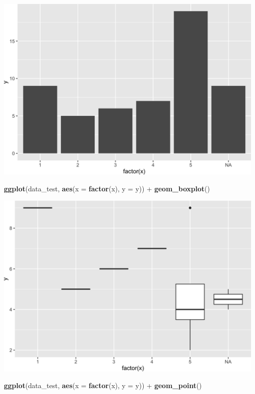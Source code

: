 \documentclass[]{article}
\newenvironment{Shaded}{\begin{snugshade}}{\end{snugshade}}
\newcommand{\KeywordTok}[1]{\textcolor[rgb]{0.13,0.29,0.53}{\textbf{{#1}}}}
\newcommand{\DataTypeTok}[1]{\textcolor[rgb]{0.13,0.29,0.53}{{#1}}}
\newcommand{\StringTok}[1]{\textcolor[rgb]{0.31,0.60,0.02}{{#1}}}
\newcommand{\NormalTok}[1]{{#1}}
\begin{document}
\includegraphics{jsm2017_files/figure-latex/ggplot-missing-vals-1.png}

\begin{Shaded}
\begin{Highlighting}[]
  \KeywordTok{ggplot}\NormalTok{(data_test,}
         \KeywordTok{aes}\NormalTok{(}\DataTypeTok{x =} \KeywordTok{factor}\NormalTok{(x),}
             \DataTypeTok{y =} \NormalTok{y)) +}\StringTok{ }
\StringTok{  }\KeywordTok{geom_boxplot}\NormalTok{()}
\end{Highlighting}
\end{Shaded}

\includegraphics{jsm2017_files/figure-latex/ggplot-missing-vals-2.png}

\begin{Shaded}
\begin{Highlighting}[]
  \KeywordTok{ggplot}\NormalTok{(data_test,}
         \KeywordTok{aes}\NormalTok{(}\DataTypeTok{x =} \KeywordTok{factor}\NormalTok{(x),}
             \DataTypeTok{y =} \NormalTok{y)) +}\StringTok{ }
\StringTok{  }\KeywordTok{geom_point}\NormalTok{()}
\end{Highlighting}
\end{Shaded}
\end{document}
